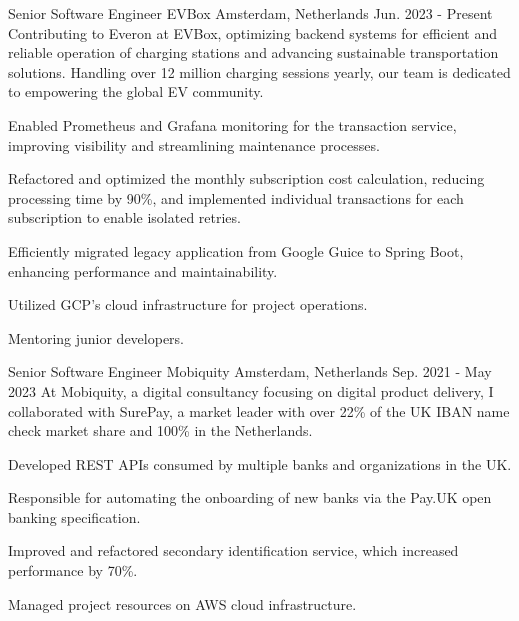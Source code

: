 

\begin{cventries}
  \cventry
  {Senior Software Engineer} %
  {EVBox} %
  {Amsterdam, Netherlands} %
  {Jun. 2023 - Present} %
  {
    Contributing to Everon at EVBox, optimizing backend systems for efficient and reliable operation of charging stations and advancing sustainable transportation solutions. Handling over 12 million charging sessions yearly, our team is dedicated to empowering the global EV community.
  }
  {
    \begin{cvitems} %
      \item {Enabled Prometheus and Grafana monitoring for the transaction service, improving visibility and streamlining maintenance processes.}
      \item {Refactored and optimized the monthly subscription cost calculation, reducing processing time by 90\%, and implemented individual transactions for each subscription to enable isolated retries.}
      \item {Efficiently migrated legacy application from Google Guice to Spring Boot, enhancing performance and maintainability.}
      \item {Utilized GCP's cloud infrastructure for project operations.}
      \item {Mentoring junior developers.}
    \end{cvitems}
  }

  \cventry
    {Senior Software Engineer} %
    {Mobiquity} %
    {Amsterdam, Netherlands} %
    {Sep. 2021 - May 2023} %
    {
      At Mobiquity, a digital consultancy focusing on digital product delivery, I collaborated with SurePay, a market leader with over 22\% of the UK IBAN name check market share and 100\% in the Netherlands.
    }
    {
      \begin{cvitems} %
        \item {Developed REST APIs consumed by multiple banks and organizations in the UK.}
        \item {Responsible for automating the onboarding of new banks via the Pay.UK open banking specification.}
        \item {Improved and refactored secondary identification service, which increased performance by 70\%.}
        \item {Managed project resources on AWS cloud infrastructure.}
      \end{cvitems}
    }


\end{cventries}
